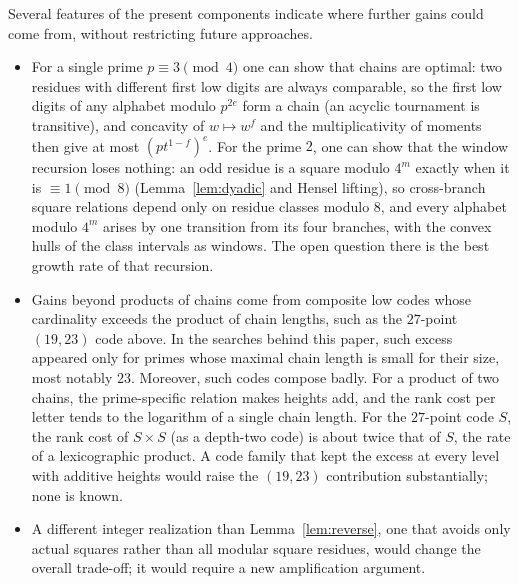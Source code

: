 \documentclass[11pt]{article}
\theoremstyle{definition}
\theoremstyle{remark}
\begin{document}
Several features of the present components indicate where further gains could
come from, without restricting future approaches.
\begin{itemize}
\item For a single prime $p\equiv3\pmod4$ one can show that chains are
optimal: two residues with different first low digits are always comparable,
so the first low digits of any alphabet modulo $p^{2e}$ form a chain (an
acyclic tournament is transitive), and concavity of $w\mapsto w^f$ and the
multiplicativity of moments then give at most $(pt^{1-f})^e$. For the prime $2$,
one can show that the window recursion loses nothing: an odd residue is a
square modulo $4^m$ exactly when it is $\equiv1\pmod8$
(Lemma~\ref{lem:dyadic} and Hensel lifting), so cross-branch square relations
depend only on residue classes modulo $8$, and every alphabet modulo $4^m$ arises
by one transition from its four branches, with the convex hulls of the class
intervals as windows. The open
question there is the best growth rate of that recursion.
\item Gains beyond products of chains come from composite low codes whose
cardinality exceeds the product of chain lengths, such as the $27$-point
$(19,23)$ code above. In the searches behind this paper, such excess
appeared only for primes whose maximal chain length is small for their size,
most notably $23$. Moreover, such codes compose badly. For a product of two chains, the
prime-specific relation makes heights add, and the rank cost per letter tends
to the logarithm of a single chain length. For the $27$-point code $S$, the
rank cost of $S\times S$ (as a depth-two code) is about twice that of $S$, the
rate of a lexicographic product. A code family that kept the excess at every
level with additive heights would raise the $(19,23)$ contribution
substantially; none is known.
\item A different integer realization than Lemma~\ref{lem:reverse}, one
that avoids only actual squares rather than all modular square residues,
would change the overall trade-off; it would require a new amplification
argument.
\end{itemize}

\appendix
\end{document}
